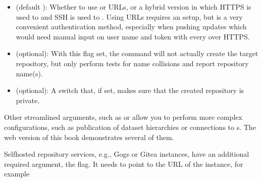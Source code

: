 \begin{itemize}
\item {} 
\sphinxAtStartPar
{} (default ): Whether to use {\hyperref[\detokenize{glossary:term-SSH}]{}} or {\hyperref[\detokenize{glossary:term-https}]{}} URLs, or a hybrid version in which HTTPS is used to  and SSH is used to . Using {\hyperref[\detokenize{glossary:term-SSH}]{}} URLs requires an {\hyperref[\detokenize{glossary:term-SSH-key}]{}} setup, but is a very convenient authentication method, especially when pushing updates \textendash{} which would need manual input on user name and token with every  over HTTPS.

\item {} 
\sphinxAtStartPar
{} (optional): With this flag set, the command will not actually create the target repository, but only perform tests for name collisions and report repository name(s).

\item {} 
\sphinxAtStartPar
{} (optional): A switch that, if set, makes sure that the created repository is private.

\end{itemize}

\sphinxAtStartPar
Other streamlined arguments, such as  or  allow you to perform more complex configurations, such as publication of dataset hierarchies or connections to {\hyperref[\detokenize{glossary:term-special-remote}]{}}s.
The web version of this book demonstrates several of them.

\sphinxAtStartPar
Self\sphinxhyphen{}hosted repository services, e.g., Gogs or Gitea instances, have an additional required argument, the  flag.
It needs to point to the URL of the instance, for example

